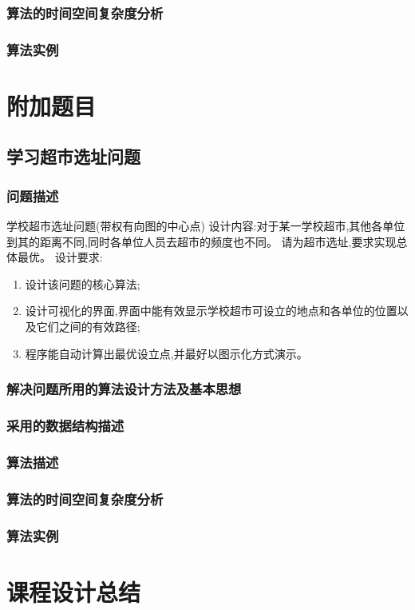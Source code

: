 \documentclass{ctexart}
\begin{document}
\subsubsection{算法的时间空间复杂度分析 }
\subsubsection{算法实例}

\newpage
\section{附加题目}
\subsection{学习超市选址问题}
\subsubsection{问题描述}
学校超市选址问题(带权有向图的中心点)
设计内容:对于某一学校超市,其他各单位到其的距离不同,同时各单位人员去超市的频度也不同。
请为超市选址,要求实现总体最优。
设计要求:
\begin{enumerate}
	\item 设计该问题的核心算法;
	\item 设计可视化的界面,界面中能有效显示学校超市可设立的地点和各单位的位置以及它们之间的有效路径;
	\item 程序能自动计算出最优设立点,并最好以图示化方式演示。
\end{enumerate}
\subsubsection{解决问题所用的算法设计方法及基本思想}
\subsubsection{采用的数据结构描述}
\subsubsection{算法描述 }
\subsubsection{算法的时间空间复杂度分析 }
\subsubsection{算法实例}

\section{课程设计总结}
\end{document}
